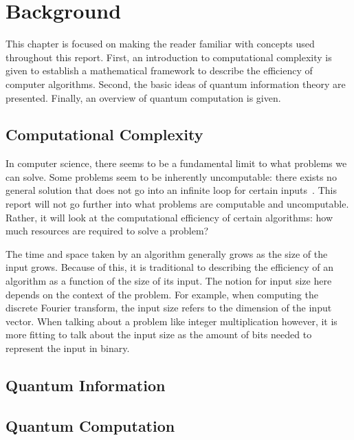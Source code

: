 \chapter{Background} \label{chap:background}
This chapter is focused on making the reader familiar with concepts used throughout this report.
First, an introduction to computational complexity is given to establish a mathematical framework to describe the efficiency of computer algorithms.
Second, the basic ideas of quantum information theory are presented.
Finally, an overview of quantum computation is given.

\section{Computational Complexity}
In computer science, there seems to be a fundamental limit to what problems we can solve.
Some problems seem to be inherently uncomputable: there exists no general solution that does not go into an infinite loop for certain inputs~\cite{church1936note, turing1937computable}.
This report will not go further into what problems are computable and uncomputable.
Rather, it will look at the computational efficiency of certain algorithms: how much resources are required to solve a problem?

The time and space taken by an algorithm generally grows as the size of the input grows.
Because of this, it is traditional to describing the efficiency of an algorithm as a function of the size of its input.
The notion for input size here depends on the context of the problem.
For example, when computing the discrete Fourier transform, the input size refers to the dimension of the input vector.
When talking about a problem like integer multiplication however, it is more fitting to talk about the input size as the amount of bits needed to represent the input in binary.




\section{Quantum Information}

\section{Quantum Computation}